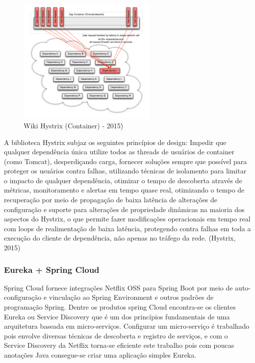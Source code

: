 \begin{figure}[h]
\centering
\includegraphics[height=6.2cm]{imagens/figura5}
\caption{Wiki Hystrix (Container) - 2015)\.}
\label{fig:exemplo}
\end{figure}

A biblioteca Hystrix subjaz os seguintes princípios de design: Impedir que qualquer dependência única utilize todos as threads de usuários de container (como Tomcat), desperdiçando carga, fornecer soluções sempre que possível para proteger os usuários contra falhas, utilizando técnicas de isolamento para limitar o impacto de qualquer dependência, otimizar o tempo de descoberta através de métricas, monitoramento e alertas em tempo quase real, otimizando o tempo de recuperação por meio de propagação de baixa latência de alterações de configuração e suporte para alterações de propriedade dinâmicas na maioria dos aspectos do Hystrix, o que permite fazer modificações operacionais em tempo real com loops de realimentação de baixa latência, protegendo contra falhas em toda a execução do cliente de dependência, não apenas no tráfego da rede. (Hystrix, 2015)

\subsubsection{Eureka + Spring Cloud}
Spring Cloud fornece integrações Netflix OSS para Spring Boot por meio de auto-configuração e vinculação ao Spring Environment e outros padrões de programação Spring. Dentre os produtos spring Cloud encontra-se os clientes Eureka ou Service Discovery que é um dos princípios fundamentais de uma arquitetura baseada em micro-serviços. Configurar um micro-serviço é trabalhado pois envolve diversas técnicas de descoberta e registro de serviços, e com o Service Discovery da Netflix torna-se eficiente este trabalho pois com poucas anotações Java consegue-se criar uma aplicação simples Eureka. 

